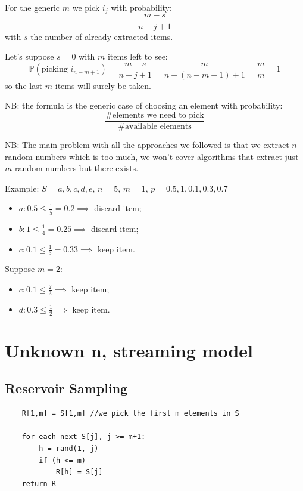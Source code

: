 For the generic $m$ we pick $i_j$ with probability:
$$
    \frac{m-s}{n-j+1}
$$
with $s$ the number of already extracted items.

Let's suppose $s=0$ with $m$ items left to see:
$$
    \mathbb{P}(\text{picking } i_{n-m+1}) = \frac{m-s}{n-j+1} = \frac{m}{n-(n-m +1)+1} = \frac{m}{m} = 1
$$
so the last $m$ items will surely be taken.

NB: the formula is the generic case of choosing an element with probability: 
$$
    \frac{\#\text{elements we need to pick}}{\#\text{available elements}}
$$

NB: The main problem with all the approaches we followed is that we extract $n$ random numbers which is too much, we won't cover algorithms that extract just $m$ random numbers but there exists.

Example: $S = {a, b, c, d, e}$, $n = 5$, $m = 1$, $p = {0.5, 1, 0.1, 0.3, 0.7}$
\begin{itemize}
    \item $a: 0.5 \leq \frac{1}{5} = 0.2 \implies$ discard item;
    \item $b: 1 \leq \frac{1}{4} = 0.25 \implies$ discard item;
    \item $c: 0.1 \leq \frac{1}{3} = 0.33 \implies$ keep item.
\end{itemize}
Suppose $m = 2$:
\begin{itemize}
    \item $c: 0.1 \leq \frac{2}{3} \implies$ keep item;
    \item $d: 0.3 \leq \frac{1}{2} \implies$ keep item.
\end{itemize}

\section{Unknown n, streaming model}
\subsection{Reservoir Sampling}
\begin{verbatim}
    R[1,m] = S[1,m] //we pick the first m elements in S
    
    for each next S[j], j >= m+1:
        h = rand(1, j)
        if (h <= m)
            R[h] = S[j]
    return R
\end{verbatim}

